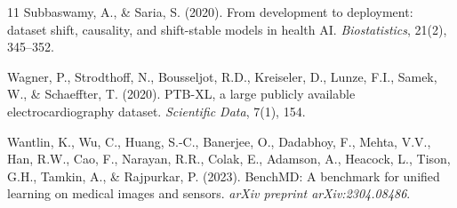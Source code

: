 \documentclass[conference]{IEEEtran}
\begin{document}
\begin{thebibliography}{11}
Subbaswamy, A., \& Saria, S. (2020).
From development to deployment: dataset shift, causality, and shift-stable models in health AI.
\textit{Biostatistics}, 21(2), 345--352.

Wagner, P., Strodthoff, N., Bousseljot, R.D., Kreiseler, D., Lunze, F.I., Samek, W., \& Schaeffter, T. (2020).
PTB-XL, a large publicly available electrocardiography dataset.
\textit{Scientific Data}, 7(1), 154.

Wantlin, K., Wu, C., Huang, S.-C., Banerjee, O., Dadabhoy, F., Mehta, V.V., Han, R.W., Cao, F., Narayan, R.R., Colak, E., Adamson, A., Heacock, L., Tison, G.H., Tamkin, A., \& Rajpurkar, P. (2023).
BenchMD: A benchmark for unified learning on medical images and sensors.
\textit{arXiv preprint arXiv:2304.08486}.

\end{thebibliography}
\end{document}

